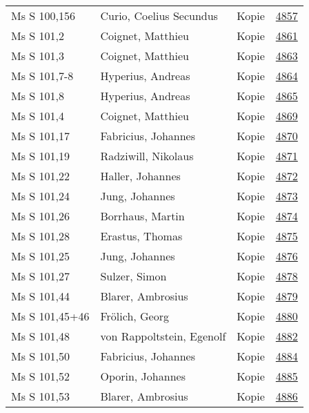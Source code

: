 \documentclass[10pt,a4paper,landscape]{report}
\begin{document}
\begin{longtable}{p{16cm}p{4cm}lr}
Ms S 100,156	&	Curio, Coelius Secundus	&	Kopie	&	\href{http://130.60.24.72/assignment/4857}{4857}\\
Ms S 101,2	&	Coignet, Matthieu	&	Kopie	&	\href{http://130.60.24.72/assignment/4861}{4861}\\
Ms S 101,3	&	Coignet, Matthieu	&	Kopie	&	\href{http://130.60.24.72/assignment/4863}{4863}\\
Ms S 101,7-8	&	Hyperius, Andreas	&	Kopie	&	\href{http://130.60.24.72/assignment/4864}{4864}\\
Ms S 101,8	&	Hyperius, Andreas	&	Kopie	&	\href{http://130.60.24.72/assignment/4865}{4865}\\
Ms S 101,4	&	Coignet, Matthieu	&	Kopie	&	\href{http://130.60.24.72/assignment/4869}{4869}\\
Ms S 101,17	&	Fabricius, Johannes	&	Kopie	&	\href{http://130.60.24.72/assignment/4870}{4870}\\
Ms S 101,19	&	Radziwill, Nikolaus	&	Kopie	&	\href{http://130.60.24.72/assignment/4871}{4871}\\
Ms S 101,22	&	Haller, Johannes	&	Kopie	&	\href{http://130.60.24.72/assignment/4872}{4872}\\
Ms S 101,24	&	Jung, Johannes	&	Kopie	&	\href{http://130.60.24.72/assignment/4873}{4873}\\
Ms S 101,26	&	Borrhaus, Martin	&	Kopie	&	\href{http://130.60.24.72/assignment/4874}{4874}\\
Ms S 101,28	&	Erastus, Thomas	&	Kopie	&	\href{http://130.60.24.72/assignment/4875}{4875}\\
Ms S 101,25	&	Jung, Johannes	&	Kopie	&	\href{http://130.60.24.72/assignment/4876}{4876}\\
Ms S 101,27	&	Sulzer, Simon	&	Kopie	&	\href{http://130.60.24.72/assignment/4878}{4878}\\
Ms S 101,44	&	Blarer, Ambrosius	&	Kopie	&	\href{http://130.60.24.72/assignment/4879}{4879}\\
Ms S 101,45+46	&	Frölich, Georg	&	Kopie	&	\href{http://130.60.24.72/assignment/4880}{4880}\\
Ms S 101,48	&	von Rappoltstein, Egenolf	&	Kopie	&	\href{http://130.60.24.72/assignment/4882}{4882}\\
Ms S 101,50	&	Fabricius, Johannes	&	Kopie	&	\href{http://130.60.24.72/assignment/4884}{4884}\\
Ms S 101,52	&	Oporin, Johannes	&	Kopie	&	\href{http://130.60.24.72/assignment/4885}{4885}\\
Ms S 101,53	&	Blarer, Ambrosius	&	Kopie	&	\href{http://130.60.24.72/assignment/4886}{4886}\\

\end{longtable}
\end{document}
